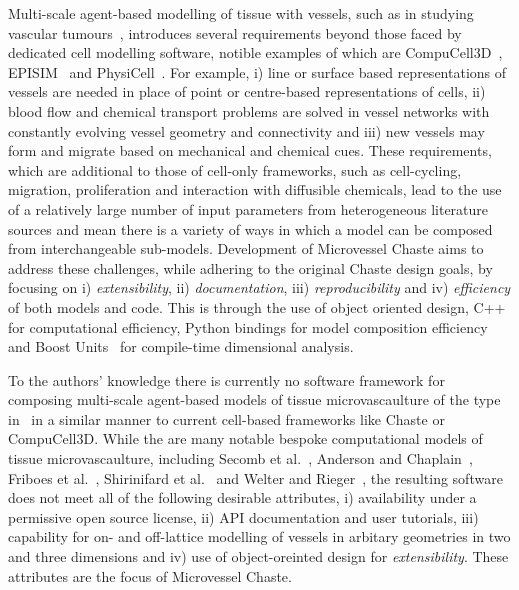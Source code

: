 \documentclass[10pt,letterpaper]{article}
\begin{document}
Multi-scale agent-based modelling of tissue with vessels, such as in studying vascular tumours~\cite{Owen2011}, introduces several requirements beyond those faced by dedicated cell modelling software, notible examples of which are CompuCell3D~\cite{Swat2012}, EPISIM~\cite{Sutterlin2013} and PhysiCell~\cite{Macklin2012}. For example, i) line or surface based representations of vessels are needed in place of point or centre-based representations of cells, ii) blood flow and chemical transport problems are solved in vessel networks with constantly evolving vessel geometry and connectivity and iii) new vessels may form and migrate based on mechanical and chemical cues. These requirements, which are additional to those of cell-only frameworks, such as cell-cycling, migration, proliferation and interaction with diffusible chemicals, lead to the use of a relatively large number of input parameters from heterogeneous literature sources and mean there is a variety of ways in which a model can be composed from interchangeable sub-models. Development of Microvessel Chaste aims to address these challenges, while adhering to the original Chaste design goals, by focusing on i) \emph{extensibility}, ii) \emph{documentation}, iii) \emph{reproducibility} and iv) \emph{efficiency} of both models and code. This is through the use of object oriented design, C++ for computational efficiency, Python bindings for model composition efficiency and Boost Units~\cite{boost161} for compile-time dimensional analysis. 

To the authors' knowledge there is currently no software framework for composing multi-scale agent-based models of tissue microvascaulture of the type in~\cite{Owen2011} in a similar manner to current cell-based frameworks like Chaste or CompuCell3D. While the are many notable bespoke computational models of tissue microvascaulture, including Secomb et al.~\cite{Secomb2013}, Anderson and Chaplain~\cite{Anderson1998}, Friboes et al.~\cite{Frieboes2007}, Shirinifard et al.~\cite{Shirinifard2009} and Welter and Rieger~\cite{Welter2013}, the resulting software does not meet all of the following desirable attributes, i) availability under a permissive open source license, ii) API documentation and user tutorials, iii) capability for on- and off-lattice modelling of vessels in arbitary geometries in two and three dimensions and iv) use of object-oreinted design for \emph{extensibility}. These attributes are the focus of Microvessel Chaste.
\end{document}
